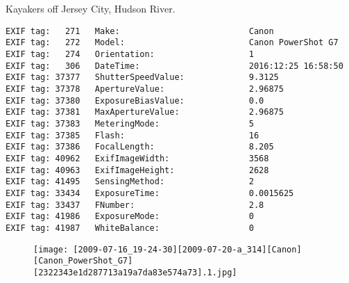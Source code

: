 \section{\protect{}}
\noindent Kayakers off Jersey City, Hudson River.
\noindent
\begin{lstlisting}
EXIF tag:   271   Make:                          Canon
EXIF tag:   272   Model:                         Canon PowerShot G7
EXIF tag:   274   Orientation:                   1
EXIF tag:   306   DateTime:                      2016:12:25 16:58:50
EXIF tag: 37377   ShutterSpeedValue:             9.3125
EXIF tag: 37378   ApertureValue:                 2.96875
EXIF tag: 37380   ExposureBiasValue:             0.0
EXIF tag: 37381   MaxApertureValue:              2.96875
EXIF tag: 37383   MeteringMode:                  5
EXIF tag: 37385   Flash:                         16
EXIF tag: 37386   FocalLength:                   8.205
EXIF tag: 40962   ExifImageWidth:                3568
EXIF tag: 40963   ExifImageHeight:               2628
EXIF tag: 41495   SensingMethod:                 2
EXIF tag: 33434   ExposureTime:                  0.0015625
EXIF tag: 33437   FNumber:                       2.8
EXIF tag: 41986   ExposureMode:                  0
EXIF tag: 41987   WhiteBalance:                  0

\end{lstlisting}
\clearpage
\begin{figure}
\raggedleft
\texttt{[image: [2009-07-16\_19-24-30][2009-07-20-a\_314][Canon][Canon\_PowerShot\_G7][2322343e1d287713a19a7da83e574a73].1.jpg]}
\end{figure}


\clearpage
